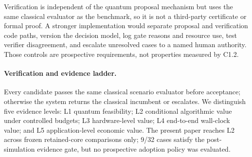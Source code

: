 Verification is independent of the quantum proposal mechanism but uses the same classical evaluator as the benchmark, so it is not a third-party certificate or formal proof. A stronger implementation would separate proposal and verification code paths, version the decision model, log gate reasons and resource use, test verifier disagreement, and escalate unresolved cases to a named human authority. Those controls are prospective requirements, not properties measured by C1.2.

\paragraph{Verification and evidence ladder.}
Every candidate passes the same classical scenario evaluator before acceptance; otherwise the system returns the classical incumbent or escalates. We distinguish five evidence levels: L1 quantum feasibility; L2 conditional algorithmic value under controlled budgets; L3 hardware-level value; L4 end-to-end wall-clock value; and L5 application-level economic value. The present paper reaches L2 across frozen retained-core comparisons only; 9/32 cases satisfy the post-simulation evidence gate, but no prospective adoption policy was evaluated.
